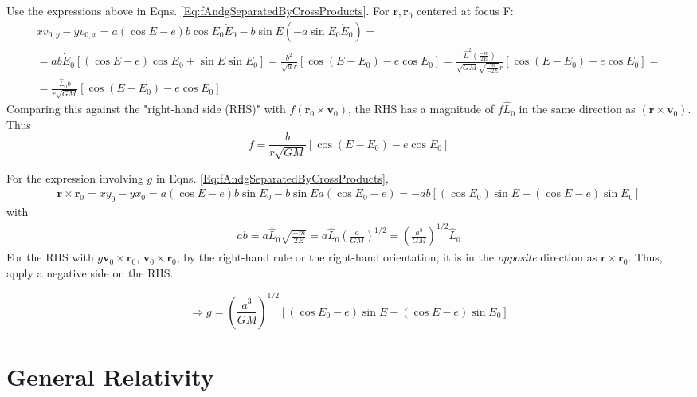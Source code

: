 \documentclass[10pt]{amsart}
\begin{document}
\begin{multicols*}{2}
Use the expressions above in Eqns. \ref{Eq:fAndgSeparatedByCrossProducts}. For $\mathbf{r}, \mathbf{r}_0$ centered at focus F:
\[
\begin{gathered} 
xv_{0, y} - y v_{0,x} = a(\cos{E} - e) b \cos{E_0} \dot{E}_0 - b\sin{E} (-a\sin{E_0} \dot{E}_0) = \\
	= ab\dot{E}_0 \left[ ( \cos{E} - e) \cos{E_0} + \sin{E} \sin{E_0} \right] = \frac{b^2}{ \sqrt{a} r} \left[ \cos{(E - E_0)} - e\cos{E_0} \right] = \frac{ \widehat{L}^2 \left( \frac{-m}{2E} \right) }{ \sqrt{GM} \sqrt{ \frac{m}{-2E} } r } \left[ \cos{(E- E_0)} - e\cos{E_0} \right] = \\
	 = \frac{\widehat{L}_0 b }{ r \sqrt{ GM} } \left[ \cos{ (E- E_0)} - e\cos{E_0} \right] 
\end{gathered} 
\]
Comparing this against the "right-hand side (RHS)" with $f (\mathbf{r}_0 \times \mathbf{v}_0)$, the RHS has a magnitude of $f \widehat{L}_0$ in the same direction as $(\mathbf{r} \times \mathbf{v}_0)$. Thus
\begin{equation}
f = \frac{ b }{ r \sqrt{ GM} } \left[ \cos{ (E- E_0)} - e\cos{E_0} \right]
\end{equation}

For the expression involving $g$ in Eqns. \ref{Eq:fAndgSeparatedByCrossProducts}, 
\[
\begin{gathered}
	\mathbf{r} \times \mathbf{r}_0 = xy_0 - yx_0 = a(\cos{E} - e) b \sin{E_0} - b\sin{E} a (\cos{E_0} - e) = -ab \left[ (\cos{E_0} ) \sin{E} - (\cos{E}-e) \sin{E_0} \right] 
\end{gathered}
\]
with
\[
\begin{gathered}
ab = a \widehat{L}_0 \sqrt{ \frac{-m}{2E} } = a\widehat{L}_0 \left( \frac{a}{GM} \right)^{1/2} = \left( \frac{a^3}{GM} \right)^{1/2} \widehat{L}_0
\end{gathered}
\]
For the RHS with $g \mathbf{v}_0 \times \mathbf{r}_0$, $\mathbf{v}_0 \times \mathbf{r}_0$, by the right-hand rule or the right-hand orientation, it is in the \emph{opposite} direction as $\mathbf{r}\times \mathbf{r}_0$. Thus, apply a negative side on the RHS.

\begin{equation}
\Longrightarrow g = \left( \frac{ a^3}{GM} \right)^{1/2} \left[ (\cos{E_0} - e) \sin{E} - (\cos{E} - e) \sin{E_0} \right] 
\end{equation}

\part{General Relativity}


\end{multicols*}
\end{document}

